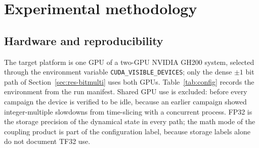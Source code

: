 \documentclass[11pt,a4paper]{article}
\newcommand{\code}[1]{\texttt{#1}}
\begin{document}
\begin{table}[!ht]\centering\small
\caption{Analytic dense capacity by storage format, in decimal units, counting the coupling matrix only, and the largest dimension that ran ($K=50$, $B\in\{1,8,64\}$): \code{gemm} with the matrix in HBM, \code{gemm} with the matrix in Grace memory or split between HBM and Grace memory (matrix size in parentheses; the FP32 sweep stopped at 300,000), and the PyTorch baseline, which can use HBM only. Entries marked $\dagger$ are \code{bit\_dense\_multi} with the matrix split over two GH200s ($B=1$), whose budget is $2\times121$ and $2\times601$~GB.}
\label{tab:capacity}
\resizebox{\linewidth}{!}{}
\end{table}

\section{Experimental methodology}\label{sec:method}
\subsection{Hardware and reproducibility}
The target platform is one GPU of a two-GPU NVIDIA GH200 system, selected through the environment variable \code{CUDA\_VISIBLE\_DEVICES}; only the dense $\pm1$ bit path of Section~\ref{sec:res-bitmulti} uses both GPUs. Table~\ref{tab:config} records the environment from the run manifest. Shared GPU use is excluded: before every campaign the device is verified to be idle, because an earlier campaign showed integer-multiple slowdowns from time-slicing with a concurrent process. FP32 is the storage precision of the dynamical state in every path; the math mode of the coupling product is part of the configuration label, because storage labels alone do not document TF32 use.
\end{document}
